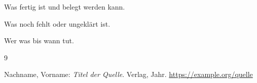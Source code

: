 \documentclass[11pt,a4paper]{scrartcl}
\begin{document}
\begin{description}[leftmargin=2.6cm,style=nextline,font=\sffamily\bfseries\small]
  \item[Stand] Was fertig ist und belegt werden kann.
  \item[Offen] Was noch fehlt oder ungeklärt ist.
  \item[Nächster Schritt] Wer was bis wann tut.
\end{description}

\begin{thebibliography}{9}
\small
{} Nachname, Vorname: \emph{Titel der Quelle}. Verlag, Jahr.
  \url{https://example.org/quelle}
\end{thebibliography}
\end{document}
